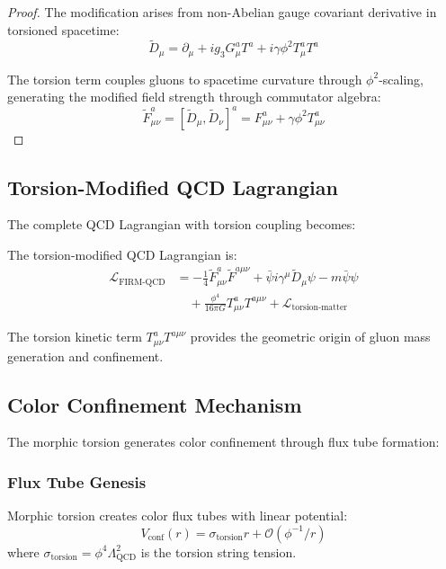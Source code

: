 \begin{proof}
The modification arises from non-Abelian gauge covariant derivative in torsioned spacetime:
\begin{equation}
\tilde{D}_\mu = \partial_\mu + ig_3 G_\mu^a T^a + i\gamma \phi^2 T_\mu^a T^a
\end{equation}

The torsion term couples gluons to spacetime curvature through $\phi^2$-scaling, generating the modified field strength through commutator algebra:
\begin{equation}
\tilde{F}_{\mu\nu}^a = [\tilde{D}_\mu, \tilde{D}_\nu]^a = F_{\mu\nu}^a + \gamma \phi^2 T_{\mu\nu}^a
\end{equation}
\end{proof}

\subsection{Torsion-Modified QCD Lagrangian}

The complete QCD Lagrangian with torsion coupling becomes:

\begin{theorem}
The torsion-modified QCD Lagrangian is:
\begin{align}
\mathcal{L}_{\text{FIRM-QCD}} &= -\frac{1}{4} \tilde{F}_{\mu\nu}^a \tilde{F}^{a\mu\nu} + \bar{\psi} i\gamma^\mu \tilde{D}_\mu \psi - m\bar{\psi}\psi \\
&\quad + \frac{\phi^4}{16\pi G} T_{\mu\nu}^a T^{a\mu\nu} + \mathcal{L}_{\text{torsion-matter}}
\label{eq:firm_qcd_lagrangian}
\end{align}
\end{theorem}

The torsion kinetic term $T_{\mu\nu}^a T^{a\mu\nu}$ provides the geometric origin of gluon mass generation and confinement.

\subsection{Color Confinement Mechanism}

The morphic torsion generates color confinement through flux tube formation:

\subsubsection{Flux Tube Genesis}

\begin{theorem}
Morphic torsion creates color flux tubes with linear potential:
\begin{equation}
V_{\text{conf}}(r) = \sigma_{\text{torsion}} r + \mathcal{O}(\phi^{-1}/r)
\label{eq:torsion_confinement_potential}
\end{equation}
where $\sigma_{\text{torsion}} = \phi^4 \Lambda_{\text{QCD}}^2$ is the torsion string tension.
\end{theorem}

